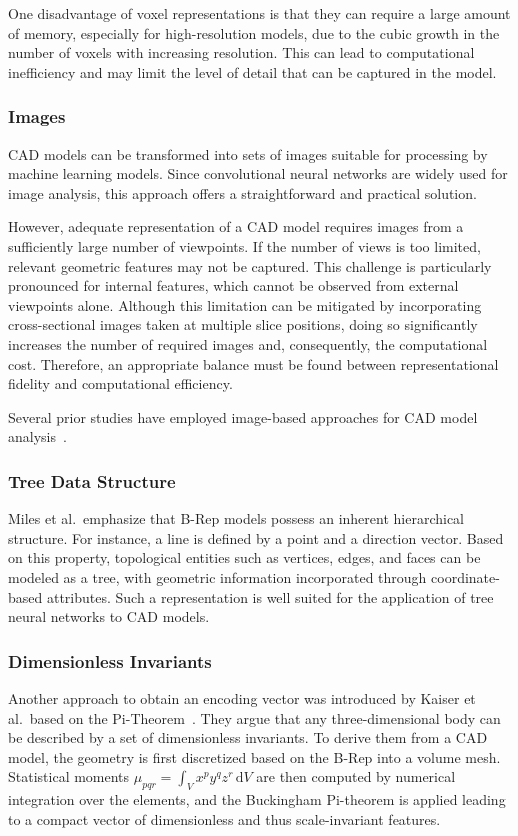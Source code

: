 \documentclass[5p,times,procedia]{elsarticle}
\begin{document}
One disadvantage of voxel representations is that they can require a large amount of memory, especially for high-resolution models, due to the cubic growth in the number of voxels with increasing resolution. This can lead to computational inefficiency and may limit the level of detail that can be captured in the model.~\cite{requicha1980representations}

\subsubsection{Images}\label{sec:CAD-Representations-Images}
CAD models can be transformed into sets of images suitable for processing by machine learning models.
Since convolutional neural networks are widely used for image analysis, this approach offers a straightforward and practical solution.

However, adequate representation of a CAD model requires images from a sufficiently large number of viewpoints.
If the number of views is too limited, relevant geometric features may not be captured.
This challenge is particularly pronounced for internal features, which cannot be observed from external viewpoints alone.
Although this limitation can be mitigated by incorporating cross-sectional images taken at multiple slice positions, doing so significantly increases the number of required images and, consequently, the computational cost.
Therefore, an appropriate balance must be found between representational fidelity and computational efficiency. 

Several prior studies have employed image-based approaches for CAD model analysis~\cite{kanezaki2018rotationnet,li2023multi}. 

\subsubsection{Tree Data Structure}\label{sec:CAD-Representations-Tree}
Miles et al.\ emphasize that \mbox{B-Rep} models possess an inherent hierarchical structure.
For instance, a line is defined by a point and a direction vector.
Based on this property, topological entities such as vertices, edges, and faces can be modeled as a tree, with geometric information incorporated through coordinate-based attributes.
Such a representation is well suited for the application of tree neural networks to CAD models.~\cite{miles2023recursive}

\subsubsection{Dimensionless Invariants}\label{sec:CAD-Representations-Dimensionless-Invariants}
Another approach to obtain an encoding vector was introduced by Kaiser et al.\ based on the Pi-Theorem~\cite{kaiser2018automated}.
They argue that any three-dimensional body can be described by a set of dimensionless invariants.
To derive them from a CAD model, the geometry is first discretized based on the \mbox{B-Rep} into a volume mesh.
Statistical moments $\mu_{pqr} = \int_V x^p y^q z^r \, \mathrm{d}V$ are then computed by
numerical integration over the elements, and the Buckingham Pi-theorem is applied leading to a compact vector of dimensionless and thus scale-invariant features.
\end{document}
